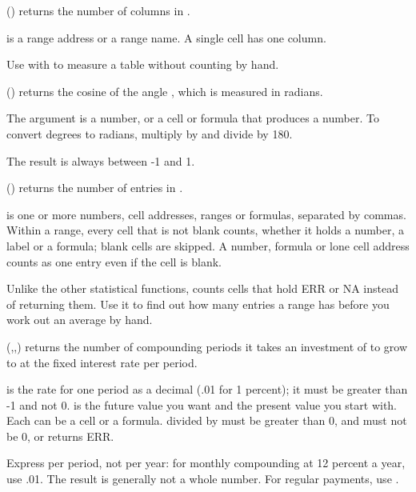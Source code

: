 \Examples
{}

() returns the number of columns in .

 is a range address or a range name. A single cell has one column.

Use  with  to measure a table without counting by hand.

\Examples
{}

() returns the cosine of the angle , which is measured in radians.

The argument  is a number, or a cell or formula that produces a number. To convert degrees to radians, multiply by  and divide by 180.

The result is always between -1 and 1.

\Examples
{}

() returns the number of entries in .

 is one or more numbers, cell addresses, ranges or formulas, separated by commas. Within a range, every cell that is not blank counts, whether it holds a number, a label or a formula; blank cells are skipped. A number, formula or lone cell address counts as one entry even if the cell is blank.

Unlike the other statistical functions,  counts cells that hold ERR or NA instead of returning them. Use it to find out how many entries a range has before you work out an average by hand.

\Examples
{}

(,,) returns the number of compounding periods it takes an investment of  to grow to  at the fixed interest rate  per period.

 is the rate for one period as a decimal (.01 for 1 percent); it must be greater than -1 and not 0.  is the future value you want and  the present value you start with. Each can be a cell or a formula.  divided by  must be greater than 0, and  must not be 0, or  returns ERR.

Express  per period, not per year: for monthly compounding at 12 percent a year, use .01. The result is generally not a whole number. For regular payments, use .


